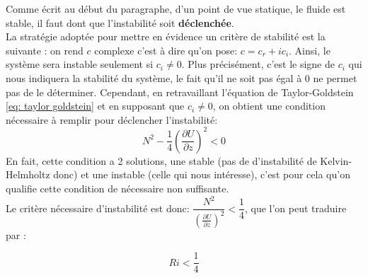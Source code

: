 \documentclass{rapportECC}
\begin{document}
Comme écrit au début du paragraphe, d'un point de vue statique, le fluide est stable, il faut dont que l'instabilité soit \textbf{déclenchée}. \\

La stratégie adoptée pour mettre en évidence un critère de stabilité est la suivante : on rend $c$ complexe c'est à dire qu'on pose: $c = c_r + ic_i $. Ainsi, le système sera instable seulement si $c_i \neq 0$. Plus précisément, c'est le signe de $c_i$ qui nous indiquera la stabilité du système, le fait qu'il ne soit pas égal à 0 ne permet pas de le déterminer. Cependant, en retravaillant l'équation de Taylor-Goldstein \eqref{eq: taylor goldstein} et en supposant que $c_i \neq 0$, on obtient une condition nécessaire à remplir pour déclencher l'instabilité:
\begin{equation}
    N^{2} - \frac{1}{4}(\frac{\partial U}{\partial z})^{2}  < 0
\end{equation}
En fait, cette condition a 2 solutions, une stable (pas de d'instabilité de Kelvin-Helmholtz donc) et une instable (celle qui nous intéresse), c'est pour cela qu'on qualifie cette condition de nécessaire non suffisante.\\
Le critère nécessaire d'instabilité est donc: $\dfrac{N^2}{(\frac{\partial U}{\partial z})^2} < \dfrac{1}{4}$, que l'on peut traduire par :

\begin{equation}
    Ri < \frac{1}{4}
\end{equation}
\end{document}
